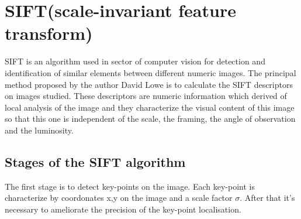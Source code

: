 \documentclass[12pt]{article}
\begin{document}
\section{ SIFT(scale-invariant feature transform)}
SIFT  is an algorithm used in sector of computer vision for detection and identification of similar elements between different numeric images.
The principal method proposed by the author David Lowe is to calculate the SIFT descriptors on images studied. These descriptors are numeric information which derived of local analysis of the image and they characterize the visual content of this image so that this one is independent of the scale, the framing, the angle of observation and the luminosity.
\subsection{Stages of the SIFT algorithm}
The first stage is to detect key-points on the image. Each key-point is characterize by coordonates  x,y on the image and a scale factor $\sigma$. After that it's necessary to ameliorate the precision of the key-point localisation.
\end{document}
